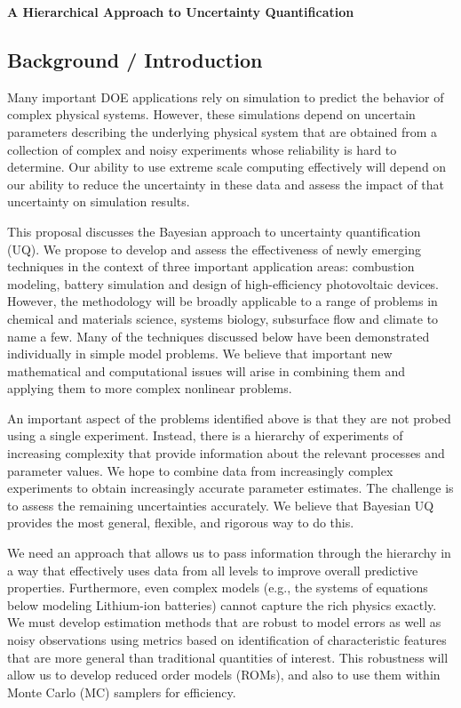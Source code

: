 \documentclass[11pt]{article}
\begin{document}
\begin{center}
{\large{\textbf{A Hierarchical Approach to Uncertainty Quantification}}}
\end{center}

\subsection*{Background / Introduction}

Many important DOE applications rely on simulation to predict the behavior of complex physical systems.
However, these simulations depend on uncertain parameters describing the underlying physical system
that are obtained from a collection of
complex and noisy experiments whose reliability is hard to determine. 
Our ability to use extreme scale computing effectively will depend on our ability to reduce the
uncertainty in these data and assess the impact of that uncertainty on simulation results.

This proposal discusses the Bayesian approach to uncertainty quantification (UQ).
We propose to develop and assess the effectiveness of newly emerging techniques in the 
context of three important application areas: combustion modeling, 
battery simulation and design of high-efficiency photovoltaic devices.
However, the methodology will be broadly applicable to a
range of problems in chemical and materials science, systems biology, subsurface flow and climate 
to name a few.
Many of the techniques discussed below have been demonstrated individually in simple model problems.
We believe that important new mathematical and computational issues will arise in combining them 
and applying them to more complex nonlinear problems.

An important aspect of the problems identified above is that they are not probed using a 
single experiment.  
Instead, there is a hierarchy of experiments of increasing complexity that provide 
information about the relevant processes and parameter values.
We hope to combine data from increasingly complex experiments to obtain increasingly accurate
parameter estimates.
The challenge is to assess the remaining uncertainties accurately.
We believe that Bayesian UQ provides the most general, flexible, and rigorous way to do this.

We need an approach that allows us to pass information through the hierarchy in a way that 
effectively uses data from all levels to improve overall predictive properties.
Furthermore, even complex models (e.g., the systems of equations below modeling Lithium-ion batteries)
cannot capture the rich physics exactly.
We must develop estimation methods that are robust to model errors as well as noisy observations
using metrics based on identification of characteristic features that are more general than
traditional quantities of interest.
This robustness will allow us to develop reduced order models (ROMs), and also to use them 
within Monte Carlo (MC) samplers for efficiency. 
\end{document}

